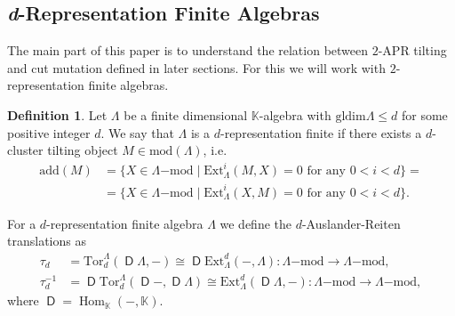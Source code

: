 \documentclass[a4paper, reqno]{amsart}
\theoremstyle{definition}
\newtheorem{mydef}[mythm]{Definition}
\newcommand{\K}{\mathbb{K}}
\DeclareMathOperator{\Hom}{\mathrm{Hom}}
\DeclareMathOperator{\DD}{\mathsf{D}}
\begin{document}
\subsection{\textit{d}-Representation Finite Algebras}
The main part of this paper is to understand the relation between $2$-APR tilting and cut mutation defined in later sections. For this we will work with $2$-representation finite algebras.

\begin{mydef}
	Let $\Lambda$ be a finite dimensional $\K$-algebra with $\mathrm{gldim}\Lambda \le d$ for some positive integer $d$. We say that $\Lambda$ is a $d$-representation finite if there exists a $d$-cluster tilting object $M\in \mathrm{mod} (\Lambda)$, i.e.
	\begin{equation*}
		\begin{aligned}
			\mathrm{add}(M) &= \{X\in \Lambda\mathrm{-mod} \mid \mathrm{Ext}^i_\Lambda(M, X) = 0 \mbox{ for any } 0 < i < d \} = \\
			&= \{X\in \Lambda\mathrm{-mod} \mid \mathrm{Ext}^i_\Lambda(X, M) = 0 \mbox{ for any } 0 < i < d \}.
		\end{aligned}
	\end{equation*}
\end{mydef}

For a $d$-representation finite algebra $\Lambda$ we define the $d$-Auslander-Reiten translations as
\begin{equation*}
	\begin{aligned}
		\tau_d &= \mathrm{Tor}^\Lambda_d(\DD\Lambda, -)\cong \DD\mathrm{Ext}^d_\Lambda(-, \Lambda): \Lambda\mathrm{-mod}\rightarrow \Lambda\mathrm{-mod}, \\
		\tau_d^{-1} &= \DD\mathrm{Tor}^\Lambda_d(\DD-, \DD\Lambda)\cong \mathrm{Ext}^d_\Lambda(\DD\Lambda, -): \Lambda\mathrm{-mod}\rightarrow \Lambda\mathrm{-mod},
	\end{aligned}
\end{equation*}
where $\DD = \Hom_\K(-, \K)$.
\end{document}
